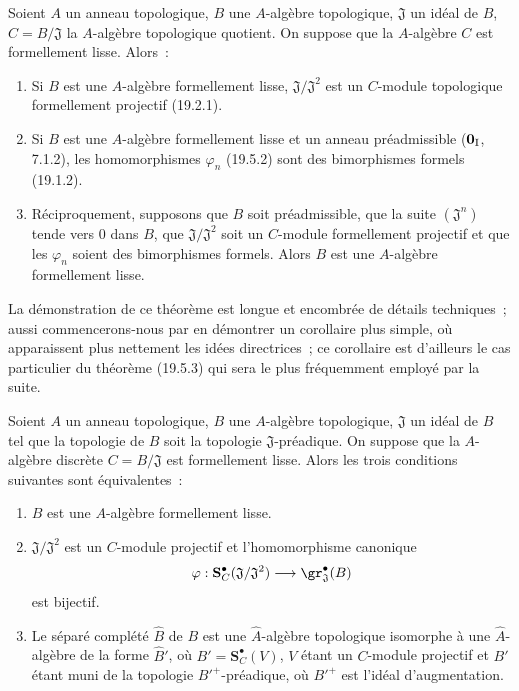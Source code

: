 \begin{theorem}[19.5.3]
\label{0.19.5.3-fr}
Soient $A$ un anneau topologique, $B$ une $A$-algèbre topologique,
$\mathfrak J$ un idéal de $B$, $C=B/\mathfrak J$ la $A$-algèbre topologique
quotient. On suppose que la $A$-algèbre $C$ est formellement lisse.
Alors~:
\begin{enumerate}
  \item[\rm(i)] Si $B$ est une $A$-algèbre formellement lisse,
  $\mathfrak J/\mathfrak J^2$ est un $C$-module topologique formellement
  projectif \textup{(19.2.1)}.
  \item[\rm(ii)] Si $B$ est une $A$-algèbre formellement lisse et un anneau
  préadmissible \textup{($\mathbf 0_{\rm I}$, 7.1.2)}, les homomorphismes $\varphi_n$
  \textup{(19.5.2)} sont des bimorphismes formels \textup{(19.1.2)}.
  \item[\rm(iii)] Réciproquement, supposons que $B$ soit préadmissible, que la
  suite $(\mathfrak J^n)$ tende vers $0$ dans $B$, que
  $\mathfrak J/\mathfrak J^2$ soit un $C$-module formellement projectif et que
  les $\varphi_n$ soient des bimorphismes formels. Alors $B$ est une
  $A$-algèbre formellement lisse.
\end{enumerate}
\end{theorem}

La démonstration de ce théorème est longue et encombrée de détails techniques~;
aussi commencerons-nous par en démontrer un corollaire plus simple, où
apparaissent plus nettement les idées directrices~; ce corollaire est d'ailleurs
le cas particulier du théorème (19.5.3) qui sera le plus fréquemment employé
par la suite.

\begin{corollary}[19.5.4]
\label{0.19.5.4-fr}
Soient $A$ un anneau topologique, $B$ une $A$-algèbre topologique,
$\mathfrak J$ un idéal de $B$ tel que la topologie de $B$ soit la topologie
$\mathfrak J$-préadique. On suppose que la $A$-algèbre discrète
$C=B/\mathfrak J$ est formellement lisse. Alors les trois conditions suivantes
sont équivalentes~:
\begin{enumerate}
  \item[\textup{a)}] $B$ est une $A$-algèbre formellement lisse.
  \item[\textup{b)}] $\mathfrak J/\mathfrak J^2$ est un $C$-module projectif et
  l'homomorphisme canonique
  \[
    \varphi:\mathbf S_C^\bullet(\mathfrak J/\mathfrak J^2)
    \longrightarrow\gr_{\mathfrak J}^\bullet(B)
  \]
  est bijectif.
  \item[\textup{c)}] Le séparé complété $\widehat B$ de $B$ est une
  $\widehat A$-algèbre topologique isomorphe à une $\widehat A$-algèbre de la
  forme $\widehat{B}'$, où $B'=\mathbf S_C^\bullet(V)$, $V$ étant un $C$-module
  projectif et $B'$ étant muni de la topologie ${B'}^+$-préadique, où
  ${B'}^+$ est l'idéal d'augmentation.
\end{enumerate}
\end{corollary}

